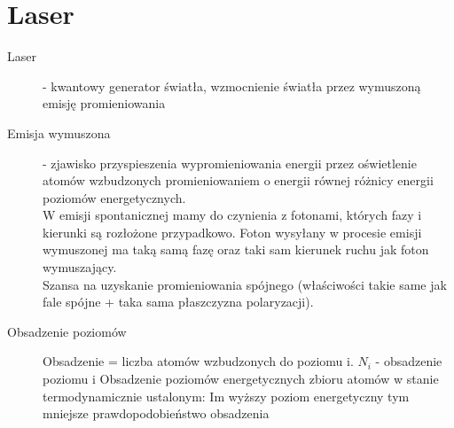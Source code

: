 \documentclass[a4paper,11pt]{article}
\begin{document}
\section{Laser}
\begin{description}
\item[Laser] - kwantowy generator światła, wzmocnienie światła przez wymuszoną emisję promieniowania
\item[Emisja wymuszona] - zjawisko przyspieszenia wypromieniowania energii przez oświetlenie atomów wzbudzonych promieniowaniem o energii równej różnicy energii poziomów energetycznych.\\
  W emisji spontanicznej mamy do czynienia z fotonami, których fazy i kierunki są rozłożone przypadkowo. Foton wysyłany w procesie emisji wymuszonej ma taką samą fazę oraz taki sam kierunek ruchu jak foton wymuszający.\\
  Szansa na uzyskanie promieniowania spójnego (właściwości takie same jak fale spójne + taka sama płaszczyzna polaryzacji).
\item[Obsadzenie poziomów] Obsadzenie = liczba atomów wzbudzonych do poziomu i. $N_i$ - obsadzenie poziomu i
  Obsadzenie poziomów energetycznych zbioru atomów w stanie termodynamicznie ustalonym: Im wyższy poziom energetyczny tym mniejsze prawdopodobieństwo obsadzenia


\end{description}
\end{document}
